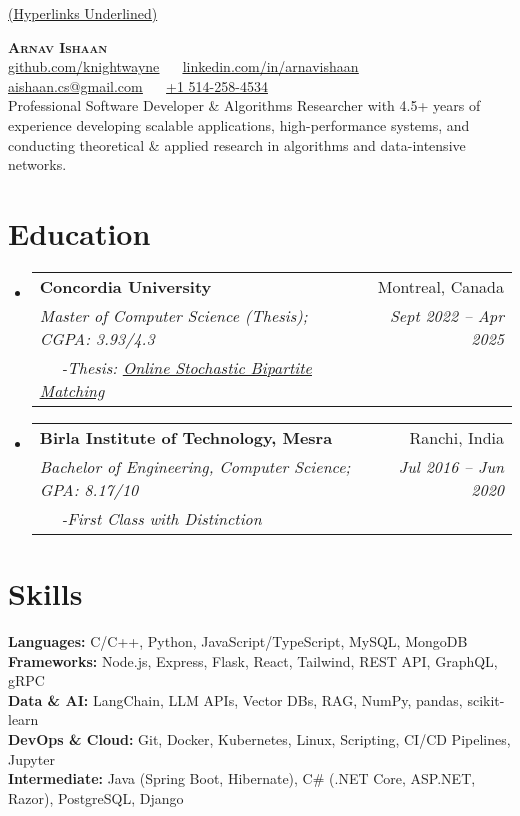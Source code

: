 \documentclass[letterpaper,11pt]{article}
\makeatletter
\newcommand{\resumeSubheadingM}[5]{\vspace{-2pt}\item
    \begin{tabular*}{0.97\textwidth}[t]{l@{\extracolsep{\fill}}r}
      \textbf{#1} & #2 \\
      \textit{\small#3} & \textit{\small #4} \\
      \textit{$\quad$ -\small #5} \\
    \end{tabular*}\vspace{-4pt}}
\newcommand{\resumeSubHeadingListStart}{\begin{itemize}[leftmargin=0.15in, label={}]}
\newcommand{\resumeSubHeadingListEnd}{\end{itemize}}
\makeatother
\begin{document}
\vspace*{-0.95cm}
\hfill \small\underline{(Hyperlinks Underlined)}

\vspace{-1.5em}
\begin{center}
    \textbf{\Huge \scshape Arnav Ishaan} \\ \vspace{4pt}
    \small 
     \href{https://github.com/knightwayne}{\underline{github.com/knightwayne}} $  \quad $
     \href{https://www.linkedin.com/in/arnavishaan}{\underline{linkedin.com/in/arnavishaan}} $ \quad $
     \href{mailto:aishaan.cs@gmail.com}{\underline{aishaan.cs@gmail.com}} $\quad $
     \href{tel:+1 514-258-4534}{+1 514-258-4534} \\
    \vspace{2pt}
    Professional Software Developer \& Algorithms Researcher with 4.5+ years of experience developing scalable applications, high-performance systems, and conducting theoretical \& applied research in algorithms and data-intensive networks.
\end{center}

\vspace{-2em}
\section{Education}
\resumeSubHeadingListStart
\resumeSubheadingM
{Concordia University}{Montreal, Canada}{Master of Computer Science (Thesis); CGPA: 3.93/4.3}{Sept 2022 -- Apr 2025}{Thesis: \it{\href{https://drive.google.com/file/d/1HY21GIft4gsGM4JQ7fOTGsPogXB8sxtV/view?usp=sharing}{\underline{Online Stochastic Bipartite Matching}}}}
\resumeSubheadingM
{Birla Institute of Technology, Mesra}{Ranchi, India}{Bachelor of Engineering, Computer Science; GPA: 8.17/10}{Jul 2016 -- Jun 2020}{First Class with Distinction}
\resumeSubHeadingListEnd


\vspace{-1.5em}
\section{Skills}
\begin{itemize}[leftmargin=0.15in, label={}]
    \small{
    \item{
    \textbf{Languages:} C/C++, Python, JavaScript/TypeScript, MySQL, MongoDB \\
    \textbf{Frameworks:} Node.js, Express, Flask, React, Tailwind, REST API, GraphQL, gRPC \\
    \textbf{Data \& AI:}  LangChain, LLM APIs, Vector DBs, RAG, NumPy, pandas, scikit-learn \\
    \textbf{DevOps \& Cloud:} Git, Docker, Kubernetes, Linux, Scripting, CI/CD Pipelines, Jupyter \\
    \textbf{Intermediate:} Java (Spring Boot, Hibernate), C\# (.NET Core, ASP.NET, Razor), PostgreSQL, Django
    }}
\end{itemize}
\end{document}
